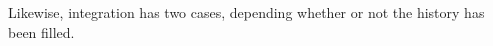 Likewise, integration has two cases, depending whether or not the history has been filled.  

\begin{table}
\label{tab:speed}
\caption{Number of computational steps required for Average-Shift algorithm.}
\end{table}